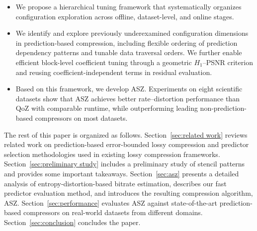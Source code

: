\begin{itemize}
\item We propose a hierarchical tuning framework that systematically organizes configuration exploration across offline, dataset-level, and online stages.
\item We identify and explore previously underexamined configuration dimensions in prediction-based compression, including flexible ordering of prediction dependency patterns and tunable data traversal orders. We further enable efficient block-level coefficient tuning through a geometric $H_1$--PSNR criterion and reusing coefficient-independent terms in residual evaluation.
\item Based on this framework, we develop ASZ. Experiments on eight scientific datasets show that ASZ achieves better rate--distortion performance than QoZ with comparable runtime, while outperforming leading non-prediction-based compressors on most datasets.
\end{itemize}

The rest of this paper is organized as follows. Section~\ref{sec:related work} reviews related work on prediction-based error-bounded lossy compression and predictor selection methodologies used in existing lossy compression frameworks. Section~\ref{sec:preliminary study} includes a preliminary study of stencil patterns and provides some important takeaways. Section~\ref{sec:asz} presents a detailed analysis of entropy-distortion-based bitrate estimation, describes our fast predictor evaluation method, and introduces the resulting compression algorithm, ASZ. Section~\ref{sec:performance} evaluates ASZ against state-of-the-art prediction-based compressors on real-world datasets from different domains. Section~\ref{sec:conclusion} concludes the paper.